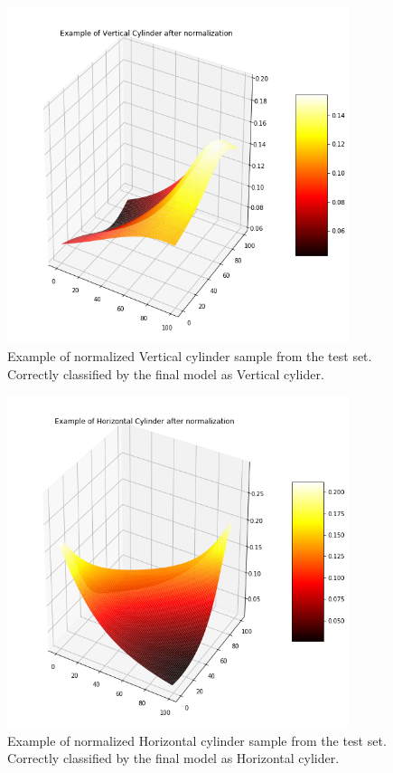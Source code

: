 \documentclass{article}
\begin{document}
\begin{figure}[!htp]
\centerline{\includegraphics[width=10cm]{img/vertical_normalized.png}}
\renewcommand{\figurename}{Figure}
\caption[Example of normalized Vertical cylinder.]{Example of normalized Vertical cylinder sample from the test set. Correctly classified by the final model as Vertical cylider.}
\label{fig:NormalizedVertical}
\end{figure}

\begin{figure}[!htp]
\centerline{\includegraphics[width=10cm]{img/horizontal_normalized.png}}
\renewcommand{\figurename}{Figure}
\caption[Example of normalized Horizontal cylinder.]{Example of normalized Horizontal cylinder sample from the test set. Correctly classified by the final model as Horizontal cylider.}
\label{fig:NormalizedHorizontal}
\end{figure}
\end{document}
